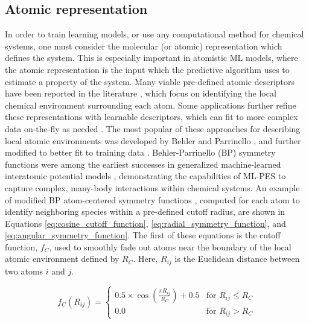 \subsection{Atomic representation}
\label{subsec:ML_atomic_representation}
In order to train learning models, or use any computational method for chemical systems, one must consider the molecular (or atomic) representation which defines the system. 
This is especially important in atomistic ML models, where the atomic representation is the input which the predictive algorithm uses to estimate a property of the system.
Many viable pre-defined atomic descriptors have been reported in the literature \cite{atom_centered_symmetry_function_behler, PIP_NN, DeePMD, esders_atomic_NNP}, which focus on identifying the local chemical environment surrounding each atom. 
Some applications further refine these representations with learnable descriptors, which can fit to more complex data on-the-fly as needed \cite{wACSF, SchNet, PhysNet, AIMNet_NSE, NequIP, interatomic_descriptors_kabylda}.
The most popular of these approaches for describing local atomic environments was developed by Behler and Parrinello \cite{atom_centered_symmetry_function_behler}, and further modified to better fit to training data \cite{TensorMol, ani-1}.
Behler-Parrinello (BP) symmetry functions were among the earliest successes in generalized machine-learned interatomic potential models \cite{behler_parrinello}, demonstrating the capabilities of ML-PES to capture complex, many-body interactions within chemical systems.
An example of modified BP atom-centered symmetry functions \cite{ani-1}, computed for each atom to identify neighboring species within a pre-defined cutoff radius, are shown in Equations \ref{eq:cosine_cutoff_function}, \ref{eq:radial_symmetry_function}, and \ref{eq:angular_symmetry_function}. 
The first of these equations is the cutoff function, $f_C$, used to smoothly fade out atoms near the boundary of the local atomic environment defined by $R_C$. Here, $R_{ij}$ is the Euclidean distance between two atoms $i$ and $j$. 

\begin{equation}
f_C(R_{ij}) = 
\begin{cases} 
0.5 \times \cos\left(\frac{\pi R_{ij}}{R_C}\right) + 0.5 & \text{for } R_{ij} \leq R_C \\
0.0 & \text{for } R_{ij} > R_C 
\end{cases}
\label{eq:cosine_cutoff_function}
\end{equation}

